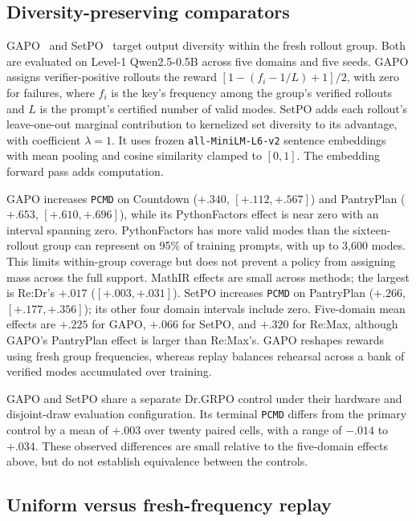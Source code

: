 \documentclass{article}
\newcommand{\1}{\mathbf 1}
\newcommand{\pmd}{\texttt{PCMD}}
\theoremstyle{remark}
\theoremstyle{definition}
\theoremstyle{plain}
\begin{document}
\subsection{Diversity-preserving comparators}
\label{app:diversity-comparators}

GAPO~\citep{anschel2025groupaware} and SetPO~\citep{li2026setpo} target
output diversity within the fresh rollout group. Both are evaluated on
Level-1 Qwen2.5-0.5B across five domains and five seeds. GAPO assigns
verifier-positive rollouts the reward $[1-(f_i-1/L)+1]/2$, with zero for
failures, where $f_i$ is the key's frequency among the group's verified
rollouts and $L$ is the prompt's certified number of valid modes.
SetPO adds each rollout's leave-one-out marginal contribution to kernelized
set diversity to its advantage, with coefficient $\lambda=1$.
It uses frozen \texttt{all-MiniLM-L6-v2} sentence embeddings with mean pooling
and cosine similarity clamped to $[0,1]$. The embedding forward pass adds
computation.

GAPO increases \pmd{} on Countdown ($+.340$, $[+.112,+.567]$) and PantryPlan
($+.653$, $[+.610,+.696]$), while its PythonFactors effect is near zero
with an interval spanning zero. PythonFactors has more valid modes than the
sixteen-rollout group can represent on 95\% of training prompts, with up to 3,600
modes. This limits within-group coverage but does not prevent a policy from
assigning mass across the full support. MathIR effects are small across
methods; the largest is Re:Dr's $+.017$ ($[+.003,+.031]$).
SetPO increases \pmd{} on PantryPlan ($+.266$, $[+.177,+.356]$); its other
four domain intervals include zero. Five-domain mean effects are $+.225$
for GAPO, $+.066$ for SetPO, and $+.320$ for Re:Max, although GAPO's
PantryPlan effect is larger than Re:Max's. GAPO reshapes rewards using fresh
group frequencies, whereas replay balances rehearsal across a bank of
verified modes accumulated over training.

GAPO and SetPO share a separate Dr.GRPO control under their hardware and
disjoint-draw evaluation configuration. Its terminal \pmd{} differs from
the primary control by a mean of $+.003$ over twenty paired cells, with a
range of $-.014$ to $+.034$. These observed differences are small relative
to the five-domain effects above, but do not establish equivalence between
the controls.

\subsection{Uniform versus fresh-frequency replay}
\label{app:frequency-replay-progress}
\end{document}
